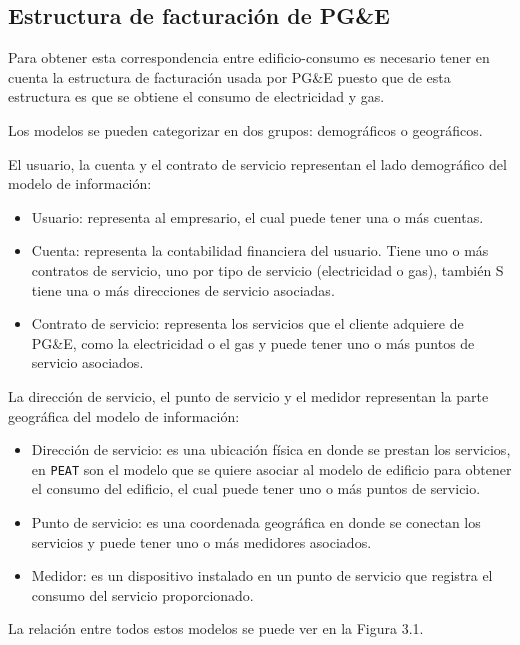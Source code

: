 \subsection{Estructura de facturación de PG\&E}
Para obtener esta correspondencia entre edificio-consumo es necesario
tener en cuenta la estructura de facturación usada por PG\&E puesto
que de esta estructura es que se obtiene el consumo de electricidad y gas.

Los modelos se pueden categorizar en dos grupos: demográficos o geográficos.

El usuario, la cuenta y el contrato de servicio representan el lado demográfico
del modelo de información:

\begin{itemize}
\item Usuario: representa al empresario, el cual puede tener una o más cuentas.
\item Cuenta: representa la contabilidad financiera del usuario. Tiene uno o más
  contratos de servicio, uno por tipo de servicio (electricidad o gas), también
  S  tiene una o más direcciones de servicio asociadas.
\item Contrato de servicio: representa los servicios que el cliente adquiere
  de PG\&E, como la electricidad o el gas y puede tener uno o más puntos
  de servicio asociados.
\end{itemize}

La dirección de servicio, el punto de servicio y el medidor representan
la parte geográfica del modelo de información:

\begin{itemize}
\item Dirección de servicio: es una ubicación física en donde se prestan los
  servicios, en \texttt{PEAT} son el modelo que se quiere asociar al modelo
  de edificio para obtener el consumo del edificio, el cual puede tener uno o más
  puntos de servicio.
\item Punto de servicio: es una coordenada geográfica en donde se conectan los
  servicios y puede tener uno o más medidores asociados.
\item Medidor: es un dispositivo instalado en un punto de servicio que registra el
  consumo del servicio proporcionado.
\end{itemize}

La relación entre todos estos modelos se puede ver en la Figura 3.1.



